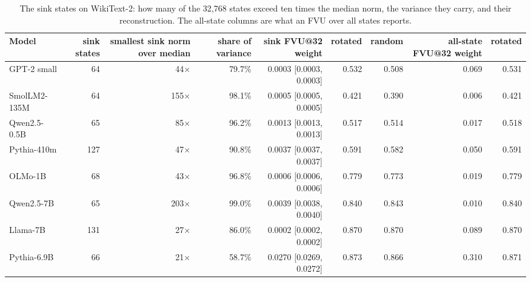 \begin{table}[H]\centering\scriptsize
\caption{The sink states on WikiText-2: how many of the 32{,}768 states exceed ten times the median norm, the variance they carry, and their reconstruction. The all-state columns are what an FVU over all states reports.}\label{app:ci-sink-wikitext}
\begin{adjustbox}{max width=\linewidth}
\begin{tabular}{lrrrrrrrr}\toprule
Model & sink states & smallest sink norm over median & share of variance & sink FVU@32 weight & rotated & random & all-state FVU@32 weight & rotated \\ \midrule
GPT-2 small & 64 & 44$\times$ & 79.7\% & 0.0003 [0.0003, 0.0003] & 0.532 & 0.508 & 0.069 & 0.531 \\
SmolLM2-135M & 64 & 155$\times$ & 98.1\% & 0.0005 [0.0005, 0.0005] & 0.421 & 0.390 & 0.006 & 0.421 \\
Qwen2.5-0.5B & 65 & 85$\times$ & 96.2\% & 0.0013 [0.0013, 0.0013] & 0.517 & 0.514 & 0.017 & 0.518 \\
Pythia-410m & 127 & 47$\times$ & 90.8\% & 0.0037 [0.0037, 0.0037] & 0.591 & 0.582 & 0.050 & 0.591 \\
OLMo-1B & 68 & 43$\times$ & 96.8\% & 0.0006 [0.0006, 0.0006] & 0.779 & 0.773 & 0.019 & 0.779 \\
Qwen2.5-7B & 65 & 203$\times$ & 99.0\% & 0.0039 [0.0038, 0.0040] & 0.840 & 0.843 & 0.010 & 0.840 \\
Llama-7B & 131 & 27$\times$ & 86.0\% & 0.0002 [0.0002, 0.0002] & 0.870 & 0.870 & 0.089 & 0.870 \\
Pythia-6.9B & 66 & 21$\times$ & 58.7\% & 0.0270 [0.0269, 0.0272] & 0.873 & 0.866 & 0.310 & 0.871 \\
\bottomrule\end{tabular}\end{adjustbox}
\end{table}
